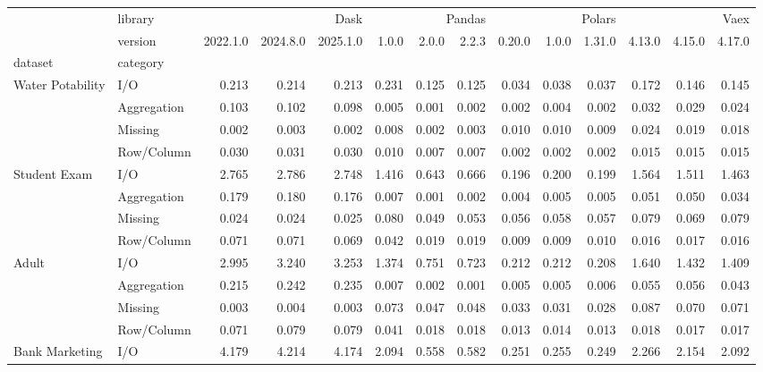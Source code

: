 \begin{tabular}{llrrrrrrrrrrrr}
\toprule
 & library & \multicolumn{3}{r}{Dask} & \multicolumn{3}{r}{Pandas} & \multicolumn{3}{r}{Polars} & \multicolumn{3}{r}{Vaex} \\
 & version & 2022.1.0 & 2024.8.0 & 2025.1.0 & 1.0.0 & 2.0.0 & 2.2.3 & 0.20.0 & 1.0.0 & 1.31.0 & 4.13.0 & 4.15.0 & 4.17.0 \\
dataset & category &  &  &  &  &  &  &  &  &  &  &  &  \\
\midrule
\multirow[t]{4}{*}{Water Potability} & I/O & 0.213 & 0.214 & 0.213 & 0.231 & 0.125 & 0.125 & 0.034 & 0.038 & 0.037 & 0.172 & 0.146 & 0.145 \\
 & Aggregation & 0.103 & 0.102 & 0.098 & 0.005 & 0.001 & 0.002 & 0.002 & 0.004 & 0.002 & 0.032 & 0.029 & 0.024 \\
 & Missing & 0.002 & 0.003 & 0.002 & 0.008 & 0.002 & 0.003 & 0.010 & 0.010 & 0.009 & 0.024 & 0.019 & 0.018 \\
 & Row/Column & 0.030 & 0.031 & 0.030 & 0.010 & 0.007 & 0.007 & 0.002 & 0.002 & 0.002 & 0.015 & 0.015 & 0.015 \\
\cline{1-14}
\multirow[t]{4}{*}{Student Exam} & I/O & 2.765 & 2.786 & 2.748 & 1.416 & 0.643 & 0.666 & 0.196 & 0.200 & 0.199 & 1.564 & 1.511 & 1.463 \\
 & Aggregation & 0.179 & 0.180 & 0.176 & 0.007 & 0.001 & 0.002 & 0.004 & 0.005 & 0.005 & 0.051 & 0.050 & 0.034 \\
 & Missing & 0.024 & 0.024 & 0.025 & 0.080 & 0.049 & 0.053 & 0.056 & 0.058 & 0.057 & 0.079 & 0.069 & 0.079 \\
 & Row/Column & 0.071 & 0.071 & 0.069 & 0.042 & 0.019 & 0.019 & 0.009 & 0.009 & 0.010 & 0.016 & 0.017 & 0.016 \\
\cline{1-14}
\multirow[t]{4}{*}{Adult} & I/O & 2.995 & 3.240 & 3.253 & 1.374 & 0.751 & 0.723 & 0.212 & 0.212 & 0.208 & 1.640 & 1.432 & 1.409 \\
 & Aggregation & 0.215 & 0.242 & 0.235 & 0.007 & 0.002 & 0.001 & 0.005 & 0.005 & 0.006 & 0.055 & 0.056 & 0.043 \\
 & Missing & 0.003 & 0.004 & 0.003 & 0.073 & 0.047 & 0.048 & 0.033 & 0.031 & 0.028 & 0.087 & 0.070 & 0.071 \\
 & Row/Column & 0.071 & 0.079 & 0.079 & 0.041 & 0.018 & 0.018 & 0.013 & 0.014 & 0.013 & 0.018 & 0.017 & 0.017 \\
\cline{1-14}
\multirow[t]{4}{*}{Bank Marketing} & I/O & 4.179 & 4.214 & 4.174 & 2.094 & 0.558 & 0.582 & 0.251 & 0.255 & 0.249 & 2.266 & 2.154 & 2.092 \\

\end{tabular}
